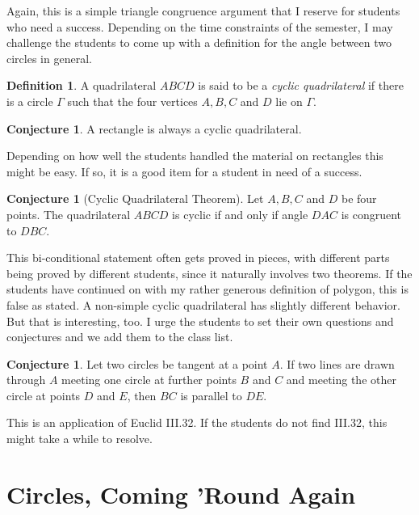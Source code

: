 \documentclass{tufte-handout}
\theoremstyle{definition}
\newtheorem{conjecture}[problem]{Conjecture}
\newtheorem*{definition}{Definition}
\begin{document}
Again, this is a simple triangle congruence argument that I reserve for students who need a success. Depending on the time constraints of the semester, I may challenge the students to come up with a definition for the angle between two circles in general.

\begin{definition}\label{defn:cyclic-quad}
A quadrilateral $ABCD$ is said to be a \emph{cyclic quadrilateral} if there is a circle $\Gamma$ such that the four vertices $A,B,C$ and $D$ lie on $\Gamma$.
\end{definition}

\begin{conjecture}\label{conj:rect-cyclic}
A rectangle is always a cyclic quadrilateral.
\end{conjecture}

Depending on how well the students handled the material on rectangles this might be easy. If so, it is a good item for a student in need of a success.

\begin{conjecture}[Cyclic Quadrilateral Theorem]\label{conj:angles-cyclic-quad}
Let $A,B,C$ and $D$ be four points. The quadrilateral $ABCD$ is cyclic if and only if angle $DAC$ is congruent to $DBC$.
\end{conjecture}

This bi-conditional statement often gets proved in pieces, with different parts being proved by different students, since it naturally involves two theorems. If the students have continued on with my rather generous definition of polygon, this is false as stated. A non-simple cyclic quadrilateral has slightly different behavior. But that is interesting, too. I urge the students to set their own questions and conjectures and we add them to the class list.


\begin{conjecture}\label{conj:tangent-to-two-circles}
Let two circles be tangent at a point $A$. If two lines are drawn through $A$ meeting one circle at further points $B$ and $C$ and meeting the other circle at points $D$ and $E$, then $BC$ is parallel to $DE$.
\end{conjecture}

This is an application of Euclid III.32. If the students do not find III.32, this might take a while to resolve.

\clearpage
\setcounter{section}{10}
\setcounter{problem}{0}
\section{Circles, Coming 'Round Again}
\end{document}
